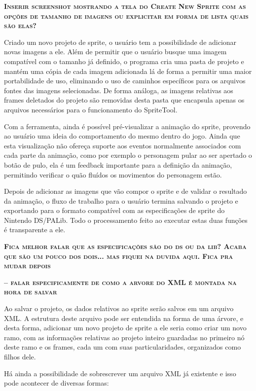 \documentclass[brazil]{abnt}
\begin{document}
\textsc{\textbf{Inserir screenshot mostrando a tela do Create New Sprite com as opções de tamanho de imagens ou explicitar em forma de lista quais são elas?}}

Criado um novo projeto de sprite, o usuário tem a possibilidade de adicionar novas imagens a ele. Além de permitir que o usuário busque uma imagem compatível com o tamanho já definido, o programa cria uma pasta de projeto e mantém uma cópia de cada imagem adicionada lá de forma a permitir uma maior portabilidade de uso, eliminando o uso de caminhos específicos para os arquivos fontes das imagens selecionadas. De forma análoga, as imagens relativas aos frames deletados do projeto são removidas desta pasta que encapsula apenas os arquivos necessários para o funcionamento do SpriteTool.

Com a ferramenta, ainda é possível pré-visualizar a animação do sprite, provendo ao usuário uma ideia do comportamento do mesmo dentro do jogo. Ainda que esta  visualização não ofereça suporte aos eventos normalmente associados com cada parte da animação, como por exemplo o personagem pular ao ser apertado o botão de pulo, ela é um feedback importante para a definição da animação, permitindo verificar o quão fluídos os movimentos do personagem estão.

Depois de adicionar as imagens que vão compor o sprite e de validar o resultado da animação, o fluxo de trabalho para o usuário termina salvando o projeto e exportando para o formato compatível com as especificações de sprite do Nintendo DS/PALib. Todo o processamento feito ao executar estas duas funções é transparente a ele. 

\textsc{\textbf{Fica melhor falar que as especificações são do ds ou da lib? Acaba que são um pouco dos dois... mas fiquei na duvida aqui. Fica pra mudar depois}}

\textsc{\textbf{-- falar especificamente de como a arvore do XML é montada na hora de salvar}}

Ao salvar o projeto, os dados relativos ao sprite serão salvos em um arquivo XML. A estrutura deste arquivo pode ser entendida na forma de uma árvore, e desta forma, adicionar um novo projeto de sprite a ele seria como criar um novo ramo, com as informações relativas ao projeto inteiro guardadas no primeiro nó deste ramo e os frames, cada um com suas particularidades, organizados como filhos dele.

Há ainda a possibilidade de sobrescrever um arquivo XML já existente e isso pode acontecer de diversas formas: 
\end{document}
